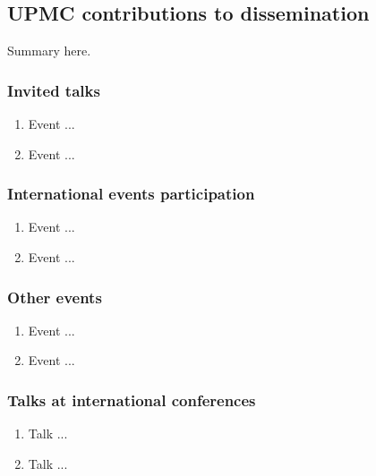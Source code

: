 \subsection{UPMC contributions to dissemination}

Summary here.

\subsubsection{Invited talks}

\begin{enumerate}
\item  Event ...

\item  Event ...
\end{enumerate}

\subsubsection{International events participation}

\begin{enumerate}

\item  Event ...

\item  Event ...

\end{enumerate}

\subsubsection{Other events}

\begin{enumerate}

\item  Event ...

\item  Event ...

\end{enumerate}

\subsubsection{Talks at international conferences}

\begin{enumerate}
\item  Talk ...

\item  Talk ...
\end{enumerate}


